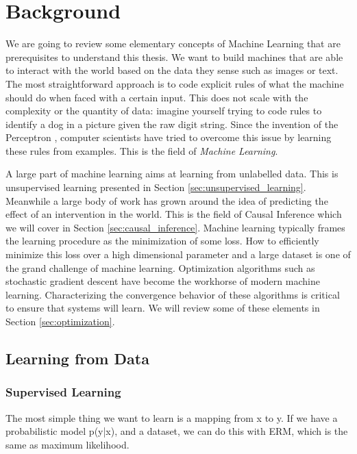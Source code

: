 \setcounter{theorem}{0}

\newcommand*{\ptrue}{\ensuremath{\bm{p}}}
\newcommand*{\pmodel}{\ensuremath{\bm{p}_{\theta}}}
\newcommand*{\lr}{\gamma}


\chapter{Background}



We are going to review some elementary concepts of Machine Learning that are prerequisites to understand this thesis. 
We want to build machines that are able to interact with the world based on the data they sense such as images or text. 
The most straightforward approach is to code explicit rules of what the machine should do when faced with a certain input. 
This does not scale with the complexity or the quantity of data: imagine yourself trying to code rules to identify a dog in a picture given the raw digit string. 
Since the invention of the Perceptron \citep{rosenblatt1957perceptron}, computer scientists have tried to overcome this issue by learning these rules from examples. 
This is the field of \textit{Machine Learning}. 

A large part of machine learning aims at learning from unlabelled data. This is unsupervised learning presented in Section \ref{sec:unsupervised_learning}.
Meanwhile a large body of work has grown around the idea of predicting the effect of an intervention in the world. This is the field of Causal Inference which we will cover in Section \ref{sec:causal_inference}. 
Machine learning typically frames the learning procedure as the minimization of some loss. How to efficiently minimize this loss over a high dimensional parameter and a large dataset is one of the grand challenge of machine learning. Optimization algorithms such as stochastic gradient descent have become the workhorse of modern machine learning. Characterizing the convergence behavior of these algorithms is critical to ensure that systems will learn. We will review some of these elements in Section \ref{sec:optimization}.

\section{Learning from Data}
\subsection{Supervised Learning}
The most simple thing we want to learn is a mapping from x to y. If we have a probabilistic model p(y|x), and a dataset, we can do this with ERM, which is the same as maximum likelihood.


